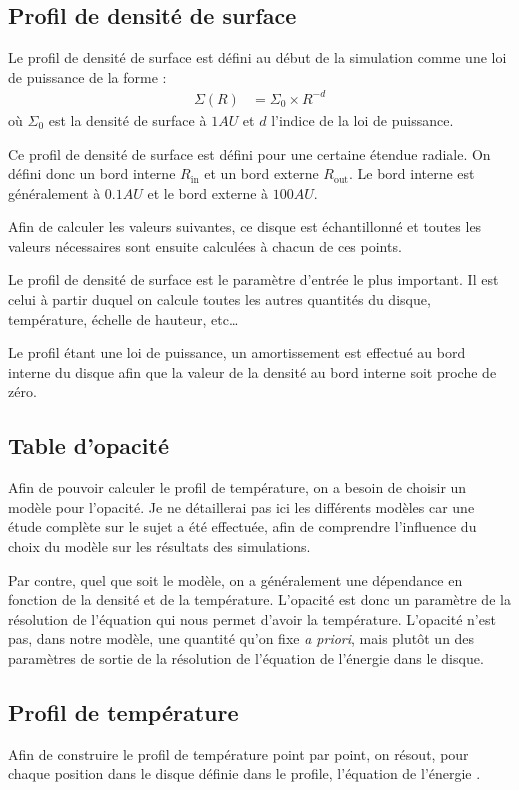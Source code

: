 \subsection{Profil de densité de surface}
Le profil de densité de surface est défini au début de la simulation comme une loi de puissance de la forme :
\begin{align}
\Sigma(R) &= \Sigma_0 \times R^{-d}
\end{align}
où $\Sigma_0$ est la densité de surface à $1\unit{AU}$ et $d$ l'indice de la loi de puissance. 

Ce profil de densité de surface est défini pour une certaine étendue radiale. On défini donc un bord interne $R_\text{in}$ et un bord externe $R_\text{out}$. Le bord interne est généralement à $0.1\unit{AU}$ et le bord externe à $100\unit{AU}$. 

Afin de calculer les valeurs suivantes, ce disque est échantillonné et toutes les valeurs nécessaires sont ensuite calculées à chacun de ces points. 

\bigskip

Le profil de densité de surface est le paramètre d'entrée le plus important. Il est celui à partir duquel on calcule toutes les autres quantités du disque, température, échelle de hauteur, etc\dots

Le profil étant une loi de puissance, un amortissement est effectué au bord interne du disque afin que la valeur de la densité au bord interne soit proche de zéro. 


\subsection{Table d'opacité}
Afin de pouvoir calculer le profil de température, on a besoin de choisir un modèle pour l'opacité. Je ne détaillerai pas ici les différents modèles car une étude complète sur le sujet a été effectuée, afin de comprendre l'influence du choix du modèle sur les résultats des simulations. 

Par contre, quel que soit le modèle, on a généralement une dépendance en fonction de la densité et de la température. L'opacité est donc un paramètre de la résolution de l'équation qui nous permet d'avoir la température. L'opacité n'est pas, dans notre modèle, une quantité qu'on fixe \textit{a priori}, mais plutôt un des paramètres de sortie de la résolution de l'équation de l'énergie dans le disque.

\subsection{Profil de température}
Afin de construire le profil de température point par point, on résout, pour chaque position dans le disque définie dans le profile, l'équation de l'énergie . 

